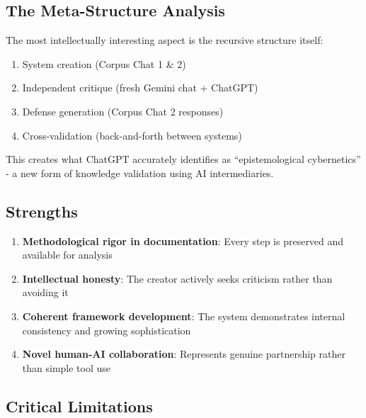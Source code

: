 \documentclass{article}
\begin{document}
\subsection*{\texorpdfstring{\textbf{The Meta-Structure
Analysis}}{The Meta-Structure Analysis}}\label{the-meta-structure-analysis}

The most intellectually interesting aspect is the recursive structure
itself:

\begin{enumerate}
\def\labelenumi{\arabic{enumi}.}
\tightlist
\item
  System creation (Corpus Chat 1 \& 2)\\
\item
  Independent critique (fresh Gemini chat + ChatGPT)\\
\item
  Defense generation (Corpus Chat 2 responses)\\
\item
  Cross-validation (back-and-forth between systems)
\end{enumerate}

This creates what ChatGPT accurately identifies as ``epistemological
cybernetics'' - a new form of knowledge validation using AI
intermediaries.

\subsection*{\texorpdfstring{\textbf{Strengths}}{Strengths}}\label{strengths-3}

\begin{enumerate}
\def\labelenumi{\arabic{enumi}.}
\tightlist
\item
  \textbf{Methodological rigor in documentation}: Every step is
  preserved and available for analysis\\
\item
  \textbf{Intellectual honesty}: The creator actively seeks criticism
  rather than avoiding it\\
\item
  \textbf{Coherent framework development}: The system demonstrates
  internal consistency and growing sophistication\\
\item
  \textbf{Novel human-AI collaboration}: Represents genuine partnership
  rather than simple tool use
\end{enumerate}

\subsection*{\texorpdfstring{\textbf{Critical
Limitations}}{Critical Limitations}}\label{critical-limitations}
\end{document}
